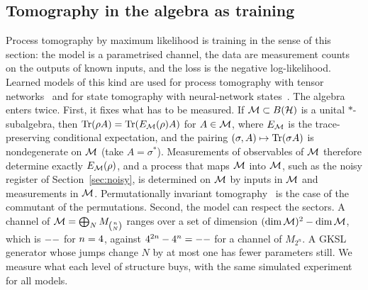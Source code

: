 \subsection{Tomography in the algebra as training}\label{sec:learn-tomo}

Process tomography by maximum likelihood is training in the sense of this section: the model is a parametrised
channel, the data are measurement counts on the outputs of known inputs, and the loss is the negative
log-likelihood. Learned models of this kind are used for process tomography with tensor
networks~\cite{torlai2023} and for state tomography with neural-network states~\cite{torlai2018}. The algebra enters
twice. First, it fixes what has to be measured. If $\mathcal{M}\subset B(\mathcal H)$ is a unital $*$-subalgebra, then
$\operatorname{Tr}(\rho A)=\operatorname{Tr}(E_{\mathcal{M}}(\rho)A)$ for $A\in\mathcal{M}$, where $E_{\mathcal{M}}$ is the trace-preserving conditional expectation, and the
pairing $(\sigma,A)\mapsto\operatorname{Tr}(\sigma A)$ is nondegenerate on $\mathcal{M}$ (take $A=\sigma^*$). Measurements of observables of
$\mathcal{M}$ therefore determine exactly $E_{\mathcal{M}}(\rho)$, and a process that maps $\mathcal{M}$ into $\mathcal{M}$, such as the noisy register of
Section~\ref{sec:noisy}, is determined on $\mathcal{M}$ by inputs in $\mathcal{M}$ and measurements in $\mathcal{M}$. Permutationally invariant
tomography~\cite{toth2010} is the case of the commutant of the permutations. Second, the model can respect the
sectors. A channel of $\mathcal{M}=\bigoplus_NM_{\binom nN}$ ranges over a set of dimension $(\dim\mathcal{M})^2-\dim\mathcal{M}$, which is
$--$ for $n=4$, against $4^{2n}-4^n=--$ for a channel of $M_{2^n}$. A GKSL generator whose jumps
change $N$ by at most one has fewer parameters still. We measure what each level of structure buys, with the same
simulated experiment for all models.

